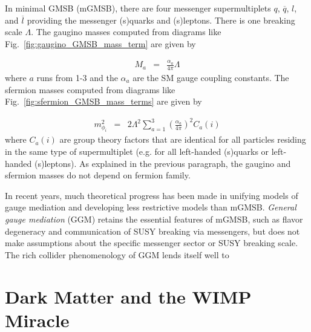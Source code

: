 \documentclass[dissertation.tex]{subfiles}
\begin{document}
In minimal GMSB (mGMSB), there are four messenger supermultiplets $q$, $\overline{q}$, $l$, and $\overline{l}$ providing the messenger (s)quarks and (s)leptons.  There is one breaking scale $\Lambda$.  The gaugino masses computed from diagrams like Fig.~\ref{fig:gaugino_GMSB_mass_term} are given by

\begin{eqnarray}
\label{eq:m_gaugino}
M_{a} &=& \frac{\alpha_{a}}{4\pi}\Lambda
\end{eqnarray}
%
where $a$ runs from 1-3 and the $\alpha_{a}$ are the SM gauge coupling constants.  The sfermion masses computed from diagrams like Fig.~\ref{fig:sfermion_GMSB_mass_terms} are given by

\begin{eqnarray}
\label{eq:m_sfermion}
m_{\phi_{i}}^{2} &=& 2\Lambda^{2}\sum_{a=1}^{3}(\frac{\alpha_{a}}{4\pi})^{2}C_{a}(i)
\end{eqnarray}
%
where $C_{a}(i)$ are group theory factors that are identical for all particles residing in the same type of supermultiplet (e.g. for all left-handed (s)quarks or left-handed (s)leptons).  As explained in the previous paragraph, the gaugino and sfermion masses do not depend on fermion family.

In recent years, much theoretical progress has been made in unifying models of gauge mediation and developing less restrictive models than mGMSB.  \textit{General gauge mediation} (GGM)\cite{Meade_Seiberg_and_Shih} retains the essential features of mGMSB, such as flavor degeneracy and communication of SUSY breaking via messengers, but does not make assumptions about the specific messenger sector or SUSY breaking scale.  The rich collider phenomenology of GGM lends itself well to 


\section{Dark Matter and the WIMP Miracle}
\end{document}
